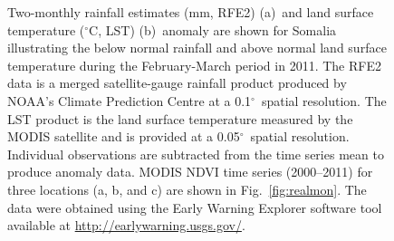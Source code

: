 \documentclass[authoryear,preprint,review,10pt]{elsarticle}
\newcommand{\degree}{\ensuremath{^\circ}}
\begin{document}
\begin{figure} [htp]
\centering
{} 
 \caption{Two-monthly rainfall estimates (mm, RFE2) (a)~and land surface temperature (\degree C, LST) (b)~anomaly are shown for Somalia illustrating the below normal rainfall and above normal land surface temperature during the February-March period in 2011. The RFE2 data is a merged satellite-gauge rainfall product produced by NOAA's Climate Prediction Centre at a 0.1\degree~spatial resolution. The LST product is the land surface temperature measured by the MODIS satellite and is provided at a 0.05\degree~spatial resolution. Individual observations are subtracted from the time series mean to produce anomaly data. MODIS NDVI time series (2000--2011) for three locations (a, b, and c) are shown in Fig.~\ref{fig:realmon}. The data were obtained using the Early Warning Explorer software tool available at \url{http://earlywarning.usgs.gov/}. }
 \label{fig:RF_LSTSomalia}
\end{figure}
\end{document}
